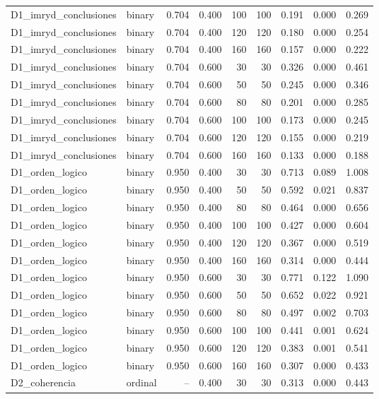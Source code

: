 \begin{table}
{\begin{tabular}{llrrrrrrr}
D1\_imryd\_conclusiones & binary & 0.704 & 0.400 & 100 & 100 & 0.191 & 0.000 & 0.269 \\
D1\_imryd\_conclusiones & binary & 0.704 & 0.400 & 120 & 120 & 0.180 & 0.000 & 0.254 \\
D1\_imryd\_conclusiones & binary & 0.704 & 0.400 & 160 & 160 & 0.157 & 0.000 & 0.222 \\
D1\_imryd\_conclusiones & binary & 0.704 & 0.600 & 30 & 30 & 0.326 & 0.000 & 0.461 \\
D1\_imryd\_conclusiones & binary & 0.704 & 0.600 & 50 & 50 & 0.245 & 0.000 & 0.346 \\
D1\_imryd\_conclusiones & binary & 0.704 & 0.600 & 80 & 80 & 0.201 & 0.000 & 0.285 \\
D1\_imryd\_conclusiones & binary & 0.704 & 0.600 & 100 & 100 & 0.173 & 0.000 & 0.245 \\
D1\_imryd\_conclusiones & binary & 0.704 & 0.600 & 120 & 120 & 0.155 & 0.000 & 0.219 \\
D1\_imryd\_conclusiones & binary & 0.704 & 0.600 & 160 & 160 & 0.133 & 0.000 & 0.188 \\
D1\_orden\_logico & binary & 0.950 & 0.400 & 30 & 30 & 0.713 & 0.089 & 1.008 \\
D1\_orden\_logico & binary & 0.950 & 0.400 & 50 & 50 & 0.592 & 0.021 & 0.837 \\
D1\_orden\_logico & binary & 0.950 & 0.400 & 80 & 80 & 0.464 & 0.000 & 0.656 \\
D1\_orden\_logico & binary & 0.950 & 0.400 & 100 & 100 & 0.427 & 0.000 & 0.604 \\
D1\_orden\_logico & binary & 0.950 & 0.400 & 120 & 120 & 0.367 & 0.000 & 0.519 \\
D1\_orden\_logico & binary & 0.950 & 0.400 & 160 & 160 & 0.314 & 0.000 & 0.444 \\
D1\_orden\_logico & binary & 0.950 & 0.600 & 30 & 30 & 0.771 & 0.122 & 1.090 \\
D1\_orden\_logico & binary & 0.950 & 0.600 & 50 & 50 & 0.652 & 0.022 & 0.921 \\
D1\_orden\_logico & binary & 0.950 & 0.600 & 80 & 80 & 0.497 & 0.002 & 0.703 \\
D1\_orden\_logico & binary & 0.950 & 0.600 & 100 & 100 & 0.441 & 0.001 & 0.624 \\
D1\_orden\_logico & binary & 0.950 & 0.600 & 120 & 120 & 0.383 & 0.001 & 0.541 \\
D1\_orden\_logico & binary & 0.950 & 0.600 & 160 & 160 & 0.307 & 0.000 & 0.433 \\
D2\_coherencia & ordinal & -- & 0.400 & 30 & 30 & 0.313 & 0.000 & 0.443 \\

\end{tabular}}
\end{table}
